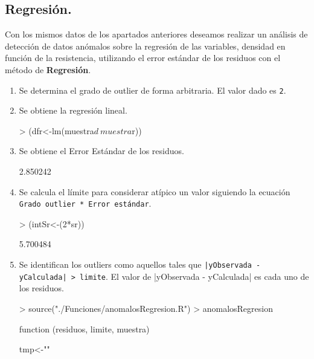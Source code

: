 \documentclass [a4paper] {article}
\begin{document}
\subsection{Regresión.}
\bigskip
Con los mismos datos de los apartados anteriores deseamos realizar un análisis de detección de datos 
anómalos sobre la regresión de las variables, densidad en función de la resistencia, utilizando el
error estándar de los residuos con el método de \textbf{Regresión}.
\begin{enumerate}
\item Se determina el grado de outlier de forma arbitraria. El valor dado es \texttt{2}.
\item Se obtiene la regresión lineal.
\begin{Schunk}
\begin{Sinput}
> (dfr<-lm(muestra$d~muestra$r))
\end{Sinput}
\end{Schunk}

\item Se obtiene el Error Estándar de los residuos.
\begin{Schunk}
\begin{Soutput}
[1] 2.850242
\end{Soutput}
\end{Schunk}

\item Se calcula el límite para considerar atípico un valor siguiendo la ecuación 
\texttt{Grado outlier * Error estándar}.
\begin{Schunk}
\begin{Sinput}
> (intSr<-(2*sr))
\end{Sinput}
\begin{Soutput}
[1] 5.700484
\end{Soutput}
\end{Schunk}

\item Se identifican los outliers como aquellos tales que \texttt{|yObservada - yCalculada| > limite}.
El valor de |yObservada - yCalculada| es cada uno de los residuos.
\begin{Schunk}
\begin{Sinput}
> source("./Funciones/anomalosRegresion.R")
> anomalosRegresion
\end{Sinput}
\begin{Soutput}
function (residuos, limite, muestra) {
    tmp<-""

}
\end{Soutput}
\end{Schunk}
\end{enumerate}
\end{document}
